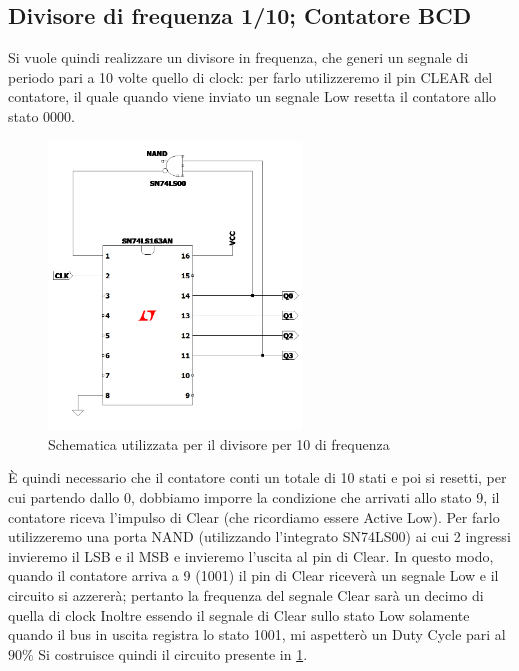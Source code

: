 \documentclass[10pt, a4paper, italian]{article}
\begin{document}
\subsection{Divisore di frequenza 1/10; Contatore BCD}
Si vuole quindi realizzare un divisore in frequenza, che generi un segnale di periodo pari a 10 volte quello di clock: per farlo utilizzeremo il pin CLEAR del contatore, il quale quando viene inviato un segnale Low resetta il contatore allo stato 0000.
\begin{figure}[htbp]
\centering
	\includegraphics[width=0.6\textwidth]{Draft1}
	\caption{Schematica utilizzata per il divisore per 10 di frequenza
	\label{schem: 10_div}}
\end{figure}
È quindi necessario che il contatore conti un totale di 10 stati e poi si resetti, per cui partendo dallo 0, dobbiamo imporre la condizione che arrivati allo stato 9, il contatore riceva l'impulso di Clear (che ricordiamo essere Active Low).
Per farlo utilizzeremo una porta NAND (utilizzando l'integrato SN74LS00) ai cui 2 ingressi invieremo il LSB e il MSB e invieremo l'uscita al pin di Clear. In questo modo, quando il contatore arriva a 9 (1001) il pin di Clear riceverà un segnale Low e il circuito si azzererà; pertanto la frequenza del segnale Clear sarà un decimo di quella di clock
Inoltre essendo il segnale di Clear sullo stato Low solamente quando il bus in uscita registra lo stato 1001, mi aspetterò un Duty Cycle pari al $90 \percent$
Si costruisce quindi il circuito presente in \cref{schem: 10_div}.
\end{document}
